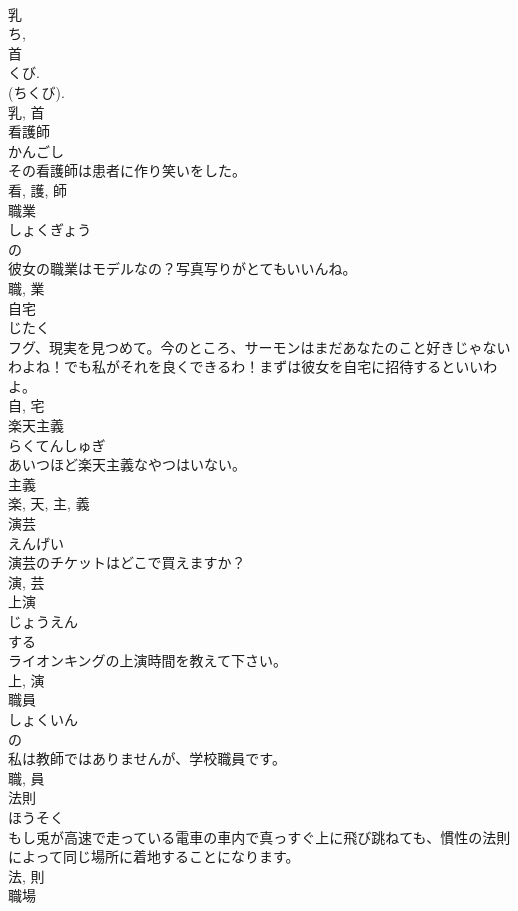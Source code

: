 \documentclass[8pt]{extreport}
\begin{document}
\begin{CJK}{UTF8}{min}
\\	乳 
\\	ち, 
\\	首 
\\	くび. 
\\	(ちくび). 
\\	乳, 首	
\\	看護師	
\\	かんごし	
\\	その看護師は患者に作り笑いをした。	
\\	看, 護, 師	
\\	職業	
\\	しょくぎょう	
\\	の 
\\	彼女の職業はモデルなの？写真写りがとてもいいんね。	
\\	職, 業	
\\	自宅	
\\	じたく	
\\	フグ、現実を見つめて。今のところ、サーモンはまだあなたのこと好きじゃないわよね！でも私がそれを良くできるわ！まずは彼女を自宅に招待するといいわよ。	
\\	自, 宅	
\\	楽天主義	
\\	らくてんしゅぎ	
\\	あいつほど楽天主義なやつはいない。	
\\	主義 
\\	楽, 天, 主, 義	
\\	演芸	
\\	えんげい	
\\	演芸のチケットはどこで買えますか？	
\\	演, 芸	
\\	上演	
\\	じょうえん	
\\	する 
\\	ライオンキングの上演時間を教えて下さい。	
\\	上, 演	
\\	職員	
\\	しょくいん	
\\	の 
\\	私は教師ではありませんが、学校職員です。	
\\	職, 員	
\\	法則	
\\	ほうそく	
\\	もし兎が高速で走っている電車の車内で真っすぐ上に飛び跳ねても、慣性の法則によって同じ場所に着地することになります。	
\\	法, 則	
\\	職場	

\end{CJK}
\end{document}
